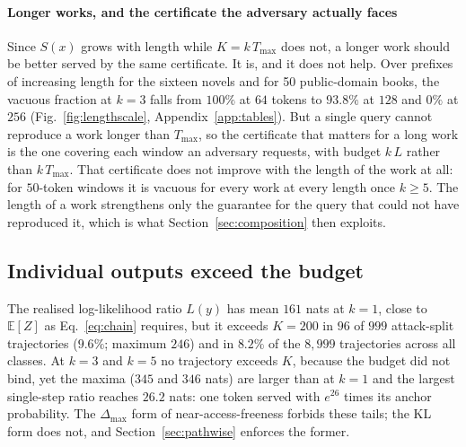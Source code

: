 \paragraph{Longer works, and the certificate the adversary actually faces}
Since $S(x)$ grows with length while $K = k\,T_{\max}$ does not, a longer work should be better served by the same certificate. It is, and it does not help. Over prefixes of increasing length for the sixteen novels and for 50 public-domain books, the vacuous fraction at $k=3$ falls from $100\%$ at $64$ tokens to $93.8\%$ at $128$ and $0\%$ at $256$ (Fig.~\ref{fig:lengthscale}, Appendix~\ref{app:tables}). But a single query cannot reproduce a work longer than $T_{\max}$, so the certificate that matters for a long work is the one covering each window an adversary requests, with budget $k\,L$ rather than $k\,T_{\max}$. That certificate does not improve with the length of the work at all: for $50$-token windows it is vacuous for every work at every length once $k \ge 5$. The length of a work strengthens only the guarantee for the query that could not have reproduced it, which is what Section~\ref{sec:composition} then exploits.

\subsection{Individual outputs exceed the budget}\label{sec:tails}
The realised log-likelihood ratio $L(y)$ has mean $161$ nats at $k=1$, close to $\mathbb{E}[Z]$ as Eq.~\eqref{eq:chain} requires, but it exceeds $K=200$ in $96$ of $999$ attack-split trajectories ($9.6\%$; maximum $246$) and in $8.2\%$ of the $8{,}999$ trajectories across all classes. At $k=3$ and $k=5$ no trajectory exceeds $K$, because the budget did not bind, yet the maxima ($345$ and $346$ nats) are larger than at $k=1$ and the largest single-step ratio reaches $26.2$ nats: one token served with $e^{26}$ times its anchor probability. The $\Delta_{\max}$ form of near-access-freeness forbids these tails; the KL form does not, and Section~\ref{sec:pathwise} enforces the former.

